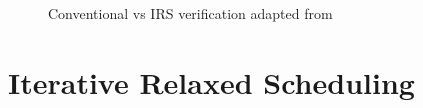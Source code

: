 \begin{figure}[h]
     \caption{Conventional vs IRS verification adapted from \citet{metzler2017quick}}
\end{figure}


\section{Iterative Relaxed Scheduling}

